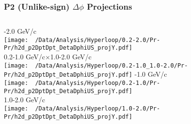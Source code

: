 \documentclass{beamer}
\begin{document}
\begin{frame}
	\frametitle{P2 (Unlike-sign) $\Delta\phi$ Projections}
	\begin{columns}
		-2.0 GeV/c\\
		\texttt{[image: ~/Data/Analysis/Hyperloop/0.2-2.0/Pr-Pr/h2d\_p2DptDpt\_DetaDphiUS\_projY.pdf]}\\0.2-1.0 GeV/c$\times$1.0-2.0 GeV/c\\
		\texttt{[image: ~/Data/Analysis/Hyperloop/0.2-1.0\_1.0-2.0/Pr-Pr/h2d\_p2DptDpt\_DetaDphiUS\_projY.pdf]}
		-1.0 GeV/c\\
		\texttt{[image: ~/Data/Analysis/Hyperloop/0.2-1.0/Pr-Pr/h2d\_p2DptDpt\_DetaDphiUS\_projY.pdf]}\\1.0-2.0 GeV/c\\
		\texttt{[image: ~/Data/Analysis/Hyperloop/1.0-2.0/Pr-Pr/h2d\_p2DptDpt\_DetaDphiUS\_projY.pdf]}
	\end{columns}
\end{frame}
\end{document}
